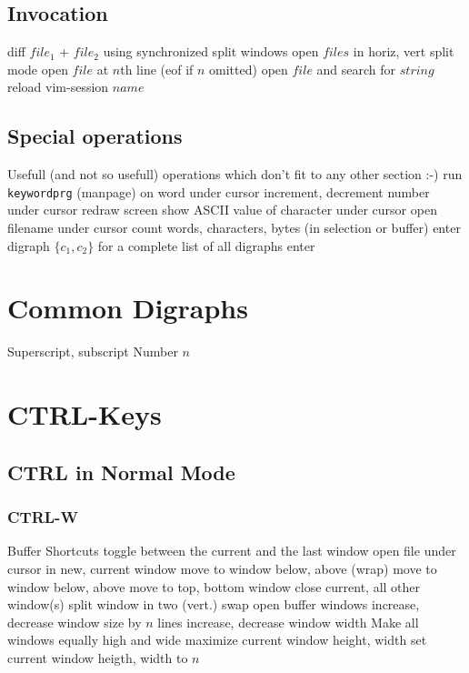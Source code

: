 \subsection{Invocation}	{}
	{diff $file_1$ + $file_2$ using synchronized split windows}
	{open $files$ in horiz, vert split mode}
	{open $file$ at $n$th line (eof if $n$ omitted)}
	{open $file$ and search for $string$ }
	{reload vim-session $name$}

\subsection{Special operations}	{Usefull (and not so usefull) operations which don't fit to any other section :-)}
	{run {\tt keywordprg} (manpage) on word under cursor}
	{increment, decrement number under cursor}
	{redraw screen}
	{show A{\smallrm SCII} value of character under cursor}
	{open filename under cursor}
	{count words, characters, bytes (in selection or buffer)}
	{enter digraph $\{c_1,c_2\}$}
	{for a complete list of all digraphs enter}

\section{Common Digraphs}	{}
	{Superscript, subscript Number $n$}

\vfil \break
\section{CTRL-Keys}	{}
\subsection{CTRL in Normal Mode}	{}
\subsubsection{CTRL-W}{Buffer Shortcuts}
\cmdS{\ctrl \^{} }	{toggle between the current and the last window}
	{open file under cursor in new, current window}
	{move to window below, above (wrap)}
	{move to window below, above}
	{move to top, bottom window}
	{close current, all other window(s)}
	{split window in two (vert.)}
	{swap open buffer windows }
	{increase, decrease window size by $n$ lines}
	{increase, decrease window width}
	{Make all windows equally high and wide}
	{maximize current window height, width}
	{set current window heigth, width to $n$ }

